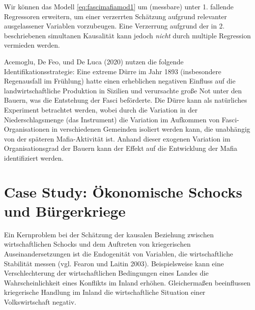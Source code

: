 \documentclass[
  a4paper,
  DIV=11,
  oneside]{scrreprt}
\begin{document}
Wir können das Modell \eqref{eq:fascimafiamod1} um (messbare) unter 1.
fallende Regressoren erweitern, um einer verzerrten Schätzung aufgrund
relevanter ausgelassener Variablen vorzubeugen. Eine Verzerrung aufgrund
der in 2. beschriebenen simultanen Kausalität kann jedoch \emph{nicht}
durch multiple Regression vermieden werden.

Acemoglu, De Feo, und De Luca (2020) nutzen die folgende
Identifikationsstrategie: Eine extreme Dürre im Jahr 1893 (insbesondere
Regenausfall im Frühlung) hatte einen erheblichen negativen Einfluss auf
die landwirtschaftliche Produktion in Sizilien und verursachte große Not
unter den Bauern, was die Entstehung der Fasci beförderte. Die Dürre
kann als natürliches Experiment betrachtet werden, wobei durch die
Variation in der Niederschlagsmenge (das Instrument) die Variation im
Aufkommen von Fasci-Organisationen in verschiedenen Gemeinden isoliert
werden kann, die unabhängig von der späteren Mafia-Aktivität ist. Anhand
dieser exogenen Variation im Organisationsgrad der Bauern kann der
Effekt auf die Entwicklung der Mafia identifiziert werden.

\section{Case Study: Ökonomische Schocks und
Bürgerkriege}\label{case-study-uxf6konomische-schocks-und-buxfcrgerkriege}

Ein Kernproblem bei der Schätzung der kausalen Beziehung zwischen
wirtschaftlichen Schocks und dem Auftreten von kriegerischen
Auseinandersetzungen ist die Endogenität von Variablen, die
wirtschaftliche Stabilität messen (vgl. Fearon und Laitin 2003).
Beispielsweise kann eine Verschlechterung der wirtschaftlichen
Bedingungen eines Landes die Wahrscheinlichkeit eines Konflikts im
Inland erhöhen. Gleichermaßen beeinflussen kriegerische Handlung im
Inland die wirtschaftliche Situation einer Volkswirtschaft negativ.
\end{document}
